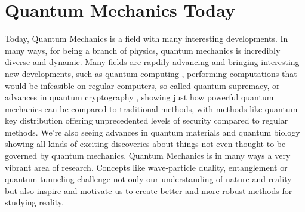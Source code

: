 \documentclass[12pt]{article}
\begin{document}
{\section{Quantum Mechanics Today}
Today, Quantum Mechanics is a field with many interesting developments. In many ways, for being a branch of physics, quantum mechanics is incredibly diverse and dynamic. Many fields are rapdily advancing and bringing interesting new developments, such as quantum computing \cite{arute2019quantum} \cite{preskill2018quantum}, performing computations that would be infeasible on regular computers, so-called quantum supremacy, or advances in quantum cryptography \cite{pirandola2020advances}, showing just how powerful quantum mechanics can be compared to traditional methods, with methods like quantum key distribution offering unprecedented levels of security compared to regular methods. \newline
We're also seeing advances in quantum materials \cite{hasan2010colloquium} \cite{novoselov2004electric} and quantum biology \cite{lambert2013quantum} \cite{arndt2009quantum} showing all kinds of exciting discoveries about things not even thought to be governed by quantum mechanics. \newline
Quantum Mechanics is in many ways a very vibrant area of research. Concepts like wave-particle duality, entanglement or quantum tunneling challenge not only our understanding of nature and reality but also inspire and motivate us to create better and more robust methods for studying reality.
}
\end{document}

